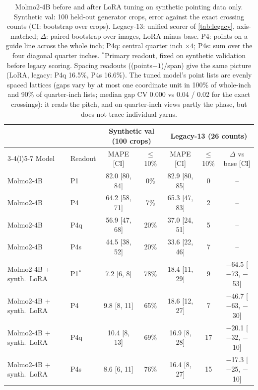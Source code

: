 \begin{table}[t]
\centering
\footnotesize
\setlength{\tabcolsep}{2pt}
\begin{tabular}{@{}llccccc@{}}
\toprule
 & & \multicolumn{2}{c}{Synthetic val (100 crops)} & \multicolumn{3}{c}{Legacy-13 (26 counts)} \\
\cmidrule(lr){3-4}\cmidrule(l){5-7}
Model & Readout & MAPE [CI] & $\le$10\% & MAPE [CI] & $\le$10\% & $\Delta$ vs base [CI] \\
\midrule
Molmo2-4B & P1 & 82.0 [80, 84] & 0\% & 82.9 [80, 85] & 0 & -- \\
Molmo2-4B & P4 & 64.2 [58, 71] & 7\% & 65.3 [47, 83] & 2 & -- \\
Molmo2-4B & P4q & 56.9 [47, 68] & 20\% & 37.0 [24, 51] & 5 & -- \\
Molmo2-4B & P4s & 44.5 [38, 52] & 20\% & 33.6 [22, 46] & 7 & -- \\
\midrule
Molmo2-4B + synth.\ LoRA & P1$^\ast$ & 7.2 [6, 8] & 78\% & 18.4 [11, 29] & 9 & $-$64.5 [$-$73, $-$53] \\
Molmo2-4B + synth.\ LoRA & P4 & 9.8 [8, 11] & 65\% & 18.6 [12, 27] & 7 & $-$46.7 [$-$63, $-$30] \\
Molmo2-4B + synth.\ LoRA & P4q & 10.4 [8, 13] & 69\% & 16.9 [8, 28] & 17 & $-$20.1 [$-$32, $-$10] \\
Molmo2-4B + synth.\ LoRA & P4s & 8.6 [6, 11] & 76\% & 16.4 [8, 27] & 15 & $-$17.3 [$-$25, $-$10] \\
\bottomrule
\end{tabular}
\caption{Molmo2-4B before and after LoRA tuning on synthetic pointing data only. Synthetic val: 100 held-out generator crops, error against the exact crossing counts (CI: bootstrap over crops). Legacy-13: unified scorer of \cref{tab:legacy}, axis-matched; $\Delta$: paired bootstrap over images, LoRA minus base. P4: points on a guide line across the whole inch; P4q: central quarter inch $\times4$; P4s: sum over the four diagonal quarter inches. $^\ast$Primary readout, fixed on synthetic validation before legacy scoring. Spacing readouts ((points$-1$)/span) give the same picture (LoRA, legacy: P4q 16.5\%, P4s 16.6\%). The tuned model's point lists are evenly spaced lattices (gaps vary by at most one coordinate unit in 100\% of whole-inch and 90\% of quarter-inch lists; median gap CV 0.000 vs 0.04 / 0.02 for the exact crossings): it reads the pitch, and on quarter-inch views partly the phase, but does not trace individual yarns.}
\label{tab:supp_ft}
\end{table}
